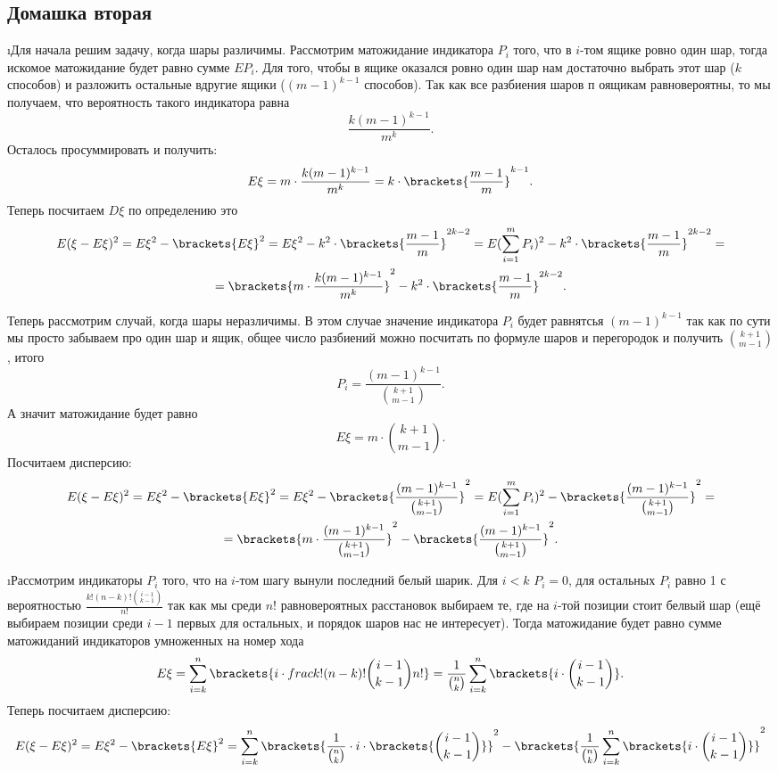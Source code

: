 \subsection{Домашка вторая}

\i Для начала решим задачу, когда шары различимы. Рассмотрим матожидание индикатора $P_i$ того, что в $i$-том ящике ровно один шар, тогда искомое матожидание будет
равно сумме $EP_i$. Для того, чтобы в ящике оказался ровно один шар нам достаточно выбрать этот шар ($k$ способов) и разложить остальные вдругие ящики 
($(m-1)^{k-1}$ способов).
Так как все разбиения шаров п оящикам равновероятны, то мы получаем, что вероятность такого индикатора равна 
\[\frac{k(m-1)^{k-1}}{m^k}.\]
Осталось просуммировать и получить: 
    \[E\xi = m \cdot \frac{k(m-1)^{k-1}}{m^k} = k \cdot \brackets{\frac{m-1}{m}}^{k-1}.\]
Теперь посчитаем $D\xi$ по определению это 
\begin{gather*}
    E(\xi - E\xi)^2 = E\xi^2 - \brackets{E\xi}^2 = E\xi^2 - k^2\cdot\brackets{\frac{m-1}{m}}^{2k-2} = 
    E(\sum_{i=1}^{m}P_i)^2 - k^2\cdot\brackets{\frac{m-1}{m}}^{2k-2} = \\ 
    = \brackets{m\cdot\frac{k(m-1)^{k-1}}{m^k}}^2 - k^2\cdot\brackets{\frac{m-1}{m}}^{2k-2}.
\end{gather*}

Теперь рассмотрим случай, когда шары неразличимы. В этом случае значение индикатора $P_i$ будет равнятсья $(m-1)^{k-1}$ так как по сути мы просто забываем про один
шар и ящик, общее число разбиений можно посчитать по формуле шаров и перегородок и получить $\binom{k+1}{m-1}$, итого 
    \[P_i = \frac{(m-1)^{k-1}}{\binom{k+1}{m-1}}.\]
А значит матожидание будет равно 
    \[E\xi = m \cdot \binom{k+1}{m-1}.\]
Посчитаем дисперсию:
\begin{gather*}
    E(\xi - E\xi)^2 = E\xi^2 - \brackets{E\xi}^2 = E\xi^2 - \brackets{\frac{(m-1)^{k-1}}{\binom{k+1}{m-1}}}^2 = 
    E(\sum_{i=1}^{m}P_i)^2 - \brackets{\frac{(m-1)^{k-1}}{\binom{k+1}{m-1}}}^2 = \\ 
    = \brackets{m\cdot\frac{(m-1)^{k-1}}{\binom{k+1}{m-1}}}^2 - \brackets{\frac{(m-1)^{k-1}}{\binom{k+1}{m-1}}}^2.
\end{gather*}

\i Рассмотрим индикаторы $P_i$ того, что на $i$-том шагу вынули последний белый шарик. Для $i < k$ $P_i = 0$, для остальных $P_i$ равно 1 с вероятностью 
$\frac{k!(n-k)!\binom{i-1}{k-1}}{n!}$ так как мы среди $n!$ равновероятных расстановок выбираем те, где на $i$-той позиции стоит белвый шар (ещё выбираем позиции
среди $i-1$ первых для остальных, и порядок шаров нас не интересует). Тогда матожидание будет равно сумме матожиданий индикаторов умноженных на номер хода
    \[E\xi = \sum_{i = k}^n \brackets{i \cdot frac{k!(n-k)!\binom{i-1}{k-1}}{n!}} = \frac{1}{\binom{n}{k}} \sum_{i = k}^n \brackets{i \cdot \binom{i-1}{k-1}}.\]
Теперь посчитаем дисперсию:
\begin{gather*}
    E(\xi - E\xi)^2 = E\xi^2 - \brackets{E\xi}^2 = 
    \sum_{i=k}^{n}\brackets{\frac{1}{\binom{n}{k}}\cdot i\cdot\brackets{\binom{i-1}{k-1}}}^2 - \brackets{\frac{1}{\binom{n}{k}} \sum_{i = k}^n \brackets{i \cdot \binom{i-1}{k-1}}}^2
\end{gather*}

